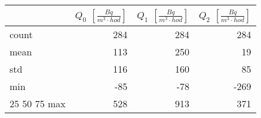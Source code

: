 \begin{tabular}{lrrr}
\toprule
{} &  $Q_0$ $\left[\si{\frac{Bq}{m^3\cdot hod}}\right]$ &  $Q_1$ $\left[\si{\frac{Bq}{m^3\cdot hod}}\right]$ &  $Q_2$ $\left[\si{\frac{Bq}{m^3\cdot hod}}\right]$ \\
\midrule
count &                                                284 &                                                284 &                                                284 \\
mean  &                                                113 &                                                250 &                                                 19 \\
std   &                                                116 &                                                160 &                                                 85 \\
min   &                                                -85 &                                                -78 &                                               -269 \\
25%
50%
75%
max   &                                                528 &                                                913 &                                                371 \\
\bottomrule
\end{tabular}
